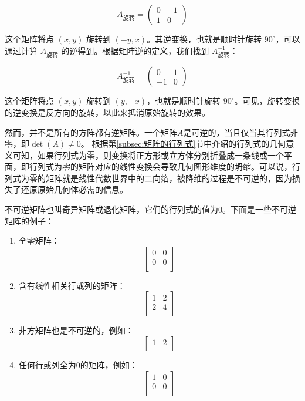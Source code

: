 \[ A_{\text{旋转}} = \begin{pmatrix} 0 & -1 \\ 1 & 0 \end{pmatrix} \]

这个矩阵将点 \( (x, y) \) 旋转到 \( (-y, x) \)。其逆变换，也就是顺时针旋转 \(90^\circ\)，可以通过计算 \(A_{\text{旋转}}\) 的逆得到。根据矩阵逆的定义，我们找到 \(A_{\text{旋转}}^{-1}\)：

\[ A_{\text{旋转}}^{-1} = \begin{pmatrix} 0 & 1 \\ -1 & 0 \end{pmatrix} \]

这个矩阵将点 \( (x, y) \) 旋转到 \( (y, -x) \)，也就是顺时针旋转 \(90^\circ\)。可见，旋转变换的逆变换是反方向的旋转，以此来抵消原始旋转的效果。


然而，并不是所有的方阵都有逆矩阵。一个矩阵$A$是可逆的，当且仅当其行列式非零，即$\det(A)\neq 0$。
根据第\ref{subsec:矩阵的行列式}节中介绍的行列式的几何意义可知，如果行列式为零，则变换将正方形或立方体分别折叠成一条线或一个平面，即行列式为零的矩阵对应的线性变换会导致几何图形维度的坍缩。可以说，行列式为零的矩阵就是线性代数世界中的二向箔，被降维的过程是不可逆的，因为损失了还原原始几何体必需的信息。

\vspace{0.5cm}

不可逆矩阵也叫奇异矩阵或退化矩阵，它们的行列式的值为0。下面是一些不可逆矩阵的例子：

\begin{enumerate}
\item 全零矩阵：
   \[
   \begin{bmatrix}
   0 & 0 \\
   0 & 0 \\
   \end{bmatrix}
   \]

\item 含有线性相关行或列的矩阵：
   \[
   \begin{bmatrix}
   1 & 2 \\
   2 & 4 \\
   \end{bmatrix}
   \]

\item 非方矩阵也是不可逆的，例如：
   \[
   \begin{bmatrix}
   1 & 2 \\
   \end{bmatrix}
   \]

\item 任何行或列全为0的矩阵，例如：
   \[
   \begin{bmatrix}
   1 & 0 \\
   0 & 0 \\
   \end{bmatrix}
   \]
\end{enumerate}

